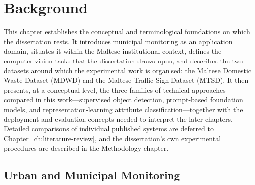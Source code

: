 
\chapter{Background}
\label{ch:background}

This chapter establishes the conceptual and terminological foundations on which the dissertation rests. It introduces municipal monitoring as an application domain, situates it within the Maltese institutional context, defines the computer-vision tasks that the dissertation draws upon, and describes the two datasets around which the experimental work is organised: the Maltese Domestic Waste Dataset (MDWD) and the Maltese Traffic Sign Dataset (MTSD). It then presents, at a conceptual level, the three families of technical approaches compared in this work---supervised object detection, prompt-based foundation models, and representation-learning attribute classification---together with the deployment and evaluation concepts needed to interpret the later chapters. Detailed comparisons of individual published systems are deferred to Chapter~\ref{ch:literature-review}, and the dissertation's own experimental procedures are described in the Methodology chapter.

\section{Urban and Municipal Monitoring}
\label{sec:bg-municipal}


